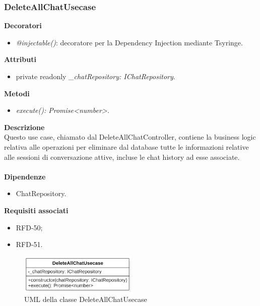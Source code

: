 \subsubsection{DeleteAllChatUsecase}
\textbf{Decoratori}
\begin{itemize}
    \item \textit{@injectable()}: decoratore per la Dependency Injection mediante Tsyringe.
\end{itemize}
\textbf{Attributi}
\begin{itemize}
    \item private readonly \textit{\_chatRepository: IChatRepository}.
\end{itemize}
\textbf{Metodi}
\begin{itemize}
    \item \textit{execute(): Promise<number>.}
\end{itemize}
\textbf{Descrizione}\\
Questo use case, chiamato dal DeleteAllChatController, contiene la business logic relativa alle operazioni per eliminare dal database tutte le informazioni relative alle sessioni di conversazione attive, incluse le chat history ad esse associate.\\ \\
\textbf{Dipendenze}
\begin{itemize}
    \item ChatRepository.
\end{itemize}
\textbf{Requisiti associati}
\begin{itemize}[itemsep=-4pt]
    \item RFD-50;
    \item RFD-51.
\end{itemize}

\begin{figure}[h!]
    \centering  
    \includegraphics[width=0.5\textwidth]{DeleteAllChatUsecase.png}
    \caption{UML della classe DeleteAllChatUsecase}
\end{figure}

